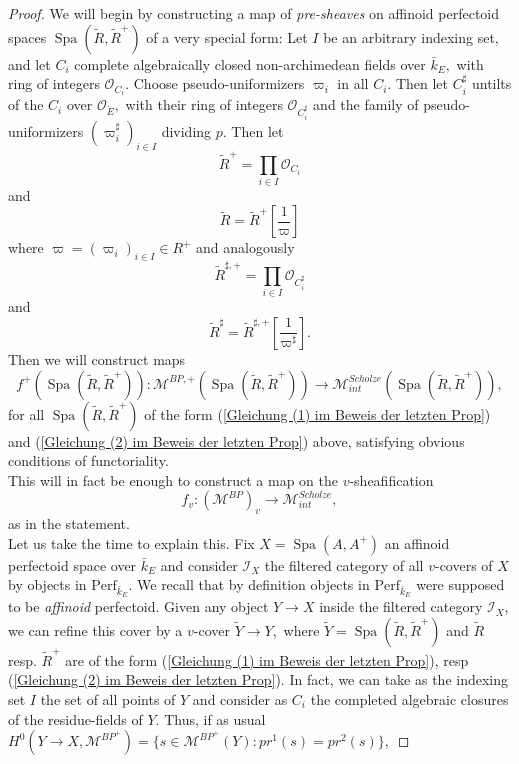 \documentclass[a4paper,10,5 pt]{amsart}
\theoremstyle{definition}
\DeclareMathOperator{\Spa}{Spa}
\begin{document}
\begin{proof}
We will begin by constructing a map of \textit{pre-sheaves} on affinoid perfectoid spaces $\Spa(\tilde{R},\tilde{R}^{+})$ of a very special form: Let $I$ be an arbitrary indexing set, and let $C_{i}$ complete algebraically closed non-archimedean fields over $\bar{k}_{E},$ with ring of integers $\mathcal{O}_{C_{i}}.$ Choose pseudo-uniformizers $\varpi_{i}$ in all $C_{i}.$ Then let $C_{i}^{\sharp}$ untilts of the $C_{i}$ over $\mathcal{O}_{\breve{E}},$ with their ring of integers $\mathcal{O}_{C^{\sharp}_{i}}$ and the family of pseudo-uniformizers $(\varpi^{\sharp}_{i})_{i\in I}$ dividing $p.$ Then let 
\begin{equation}\label{Gleichung (1) im Beweis der letzten Prop}
\tilde{R}^{+}=\prod_{i\in I} \mathcal{O}_{C_{i}}
\end{equation}
 and
\begin{equation}\label{Gleichung (2) im Beweis der letzten Prop}
 \tilde{R}=\tilde{R}^{+}[\frac{1}{\varpi}]
\end{equation}
where $\varpi=(\varpi_{i})_{i\in I}\in R^{+}$ and analogously
\begin{equation}
\tilde{R}^{\sharp,+}=\prod_{i\in I} \mathcal{O}_{C^{\sharp}_{i}}
\end{equation}
and
\begin{equation}\label{Gleichung (5) im Beweis der letzten Prop}
\tilde{R}^{\sharp}=\tilde{R}^{\sharp,+}[\frac{1}{\varpi^{\sharp}}].
\end{equation}
Then we will construct maps
\begin{equation}
f^{+}(\Spa(\tilde{R},\tilde{R}^{+}))\colon \mathcal{M}^{BP,+}(\Spa(\tilde{R},\tilde{R}^{+}))\rightarrow \mathcal{M}^{Scholze}_{int}(\Spa(\tilde{R},\tilde{R}^{+})),
\end{equation}
for all $\Spa(\tilde{R},\tilde{R}^{+})$ of the form (\ref{Gleichung (1) im Beweis der letzten Prop}) and (\ref{Gleichung (2) im Beweis der letzten Prop}) above, satisfying obvious conditions of functoriality.
\\
This will in fact be enough to construct a map on the $v$-sheafification
$$
f_{v}\colon (\mathcal{M}^{BP})_{v}\rightarrow \mathcal{M}_{int}^{Scholze},
$$
as in the statement.
\\
Let us take the time to explain this. Fix $X=\Spa(A,A^{+})$ an affinoid perfectoid space over $\bar{k}_{E}$ and consider $\mathcal{I}_{X}$ the filtered category of all $v$-covers of $X$ by objects in $\text{Perf}_{\bar{k}_{E}}.$ We recall that by definition objects in $\text{Perf}_{\bar{k}_{E}}$ were supposed to be \textit{affinoid} perfectoid. Given any object $Y\rightarrow X$ inside the filtered category $\mathcal{I}_{X}$, we can refine this cover by a $v$-cover $\tilde{Y}\rightarrow Y,$ where $\tilde{Y}=\Spa(\tilde{R},\tilde{R}^{+})$ and $\tilde{R}$ resp. $\tilde{R}^{+}$ are of the form (\ref{Gleichung (1) im Beweis der letzten Prop}), resp (\ref{Gleichung (2) im Beweis der letzten Prop}). In fact, we can take as the indexing set $I$ the set of all points of $Y$ and  consider as $C_{i}$ the completed algebraic closures of the residue-fields of $Y.$ Thus, if as usual $H^{0}(Y\rightarrow X,\mathcal{M}^{BP}^{+})=\lbrace s\in \mathcal{M}^{BP}^{+}(Y)\colon pr^{1}(s)=pr^{2}(s) \rbrace,$

\end{proof}
\end{document}
